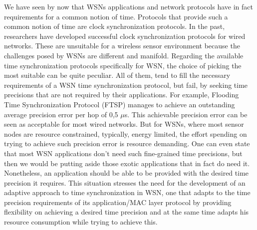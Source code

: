 We have seen by now that WSNs applications and network protocols have in fact requirements for a common notion of time. Protocols that provide such a common notion of time are clock synchronization protocols. In the past, researchers have developed successful  clock synchronization protocols for wired networks. These are unsuitable for a wireless sensor environment because the challenges posed by WSNs are different and manifold. Regarding the available time synchronization protocols specifically for WSN, the choice of picking the most suitable can be quite peculiar. All of them, tend to fill the necessary requirements of a WSN time synchronization protocol, but fail, by seeking time precisions that are not required by their applications. For example, Flooding Time Synchronization Protocol (FTSP) \cite{Maroti04:FTSP} manages to achieve an outstanding average precision error per hop of 0,5 $\mu$s. This achievable precision error can be seen as acceptable for most wired networks. But for WSNs, where most sensor nodes are resource constrained, typically, energy limited, the effort spending on trying to achieve such precision error is resource demanding. One can even state that most WSN applications don't need such fine-grained time precisions, but then we would be putting aside those exotic applications that in fact do need it. Nonetheless, an application should be able to be provided with the desired time precision it requires.
This situation stresses the need for the development of an adaptive approach to time synchronization in WSN, one that adapts to the time precision requirements of its application/MAC layer protocol by providing flexibility on achieving a desired time precision and at the same time adapts his resource consumption while trying to achieve this.\\

